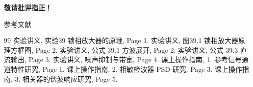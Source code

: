 \documentclass[10pt]{beamer}
\begin{document}
\begin{frame}
    \begin{center}
        \Large \textbf{敬请批评指正！}
    \end{center}
\end{frame}

\begin{frame}[allowframebreaks]{参考文献}
    
    \footnotesize
    \begin{thebibliography}{99}
         实验讲义, 实验39 锁相放大器的原理, Page 1.
         实验讲义, 图39.1 锁相放大器原理方框图, Page 2.
         实验讲义, 公式 39.1 方波展开, Page 2.
         实验讲义, 公式 39.3 直流输出, Page 3.
         实验讲义, 噪声抑制与带宽, Page 4.
         课上操作指南, 1. 参考信号通道特性研究, Page 1.
         课上操作指南, 2. 相敏检波器 PSD 研究, Page 3.
         课上操作指南, 3. 相关器的谐波响应研究, Page 5.
    \end{thebibliography}
\end{frame}
\end{document}
